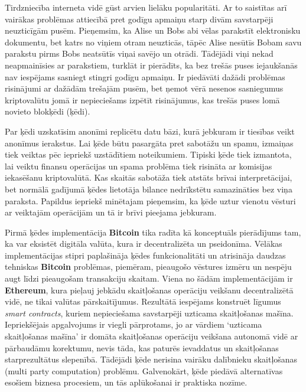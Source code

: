 Tirdzniecība interneta vidē gūst arvien lielāku popularitāti. 
Ar to saistītas arī vairākas problēmas attiecībā pret godīgu apmaiņu starp divām savstarpēji neuzticīgām pusēm. 
Pieņemsim, ka Alise un Bobs abi vēlas parakstīt elektronisku dokumentu, bet katrs no viņiem otram neuzticās, tāpēc Alise nesūtīs Bobam savu parakstu pirms Bobs neatsūtīs viņai savējo un otrādi. 
Tādējādi viņi nekad neapmainīsies ar parakstiem, turklāt ir pierādīts, ka bez trešās puses iejaukšanās nav iespējams sasniegt stingri godīgu apmaiņu.\cite{pagnia99}
Ir piedāvāti dažādi problēmas risinājumi ar dažādām trešajām pusēm, bet ņemot vērā nesenos sasniegumus kriptovalūtu jomā ir nepieciešams izpētīt risinājumus, kas trešās puses lomā novieto blokķēdi (ķēdi). 

Par ķēdi uzskatīsim anonīmi replicētu datu bāzi, kurā jebkuram ir tiesības veikt anonīmus ierakstus. Lai ķēde būtu pasargāta pret sabotāžu un spamu, izmaiņas tiek veiktas pēc iepriekš uzstādītiem noteikumiem.
Tipiski ķēde tiek izmantota, lai veiktu finansu operācijas un spama problēma tiek risināta ar komisijas iekasēšanu kriptovalūtā. Kas skaitās sabotāža tiek atstāts brīvai interpretācijai, bet normālā gadījumā ķēdes lietotāja bilance nedrīkstētu samazināties bez viņa paraksta. Papildus iepriekš minētajam pieņemsim, ka ķēde uztur vienotu vēsturi ar veiktajām operācijām un tā ir brīvi pieejama jebkuram.

Pirmā ķēdes implementācija \textbf{Bitcoin} tika radīta kā konceptuāls pierādījums tam, ka var eksistēt digitāla valūta, kura ir decentralizēta un pseidonīma. 
Vēlākas implementācijas stipri paplašināja ķēdes funkcionalitāti un atrisināja daudzas tehniskas \textbf{Bitcoin} problēmas, piemēram, pieaugošo vēstures izmēru un nespēju augt līdzi pieaugošam transakciju skaitam.\cite{barber12}
Viena no šādām implementācijām ir \textbf{Ethereum}, kura pieļauj jebkādu skaitļošanas operāciju veikšanu decentralizētā vidē, ne tikai valūtas pārskaitījumus.\cite{etherum}
Rezultātā iespējams konstruēt līgumus \textit{smart contracts}, kuriem nepieciešama savstarpēji uzticama skaitļošanas mašīna.
Iepriekšējais apgalvojums ir viegli pārprotams, jo ar vārdiem `uzticama skaitļošanas mašīna' ir domāta skaitļošanas operāciju veikšana autonomā vidē ar pārbaudāmu korektumu, nevis tāda, kas paturēs ievaddatus un skaitļošanas starprezultātus slepenībā.
Tādējādi ķēde nerisina vairāku dalībnieku skaitļošanas (multi party computation) problēmu.
Galvenokārt, ķēde piedāvā alternatīvas esošiem biznesa procesiem, un tās aplūkošanai ir praktiska nozīme.

